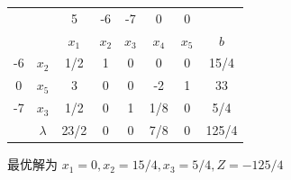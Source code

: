 \documentclass[../../main.tex]{subfiles}
\begin{document}
\begin{solution}
\begin{table}[H]
\begin{tabular}{c|c|cccccc}
               &             & 5       & -6      & -7      & 0       & 0       &       \\
               &             & \(x_1\) & \(x_2\) & \(x_3\) & \(x_4\) & \(x_5\) & \(b\) \\
            \hline
            -6 & \(x_2\)     & 1/2     & 1       & 0       & 0       & 0       & 15/4  \\
            0  & \(x_5\)     & 3       & 0       & 0       & -2      & 1       & 33    \\
            -7 & \(x_3\)     & 1/2     & 0       & 1       & 1/8     & 0       & 5/4   \\
               & \(\lambda\) & 23/2    & 0       & 0       & 7/8     & 0       & 125/4 \\
        \end{tabular}
    \end{table}
    最优解为  \(x_1 = 0, x_2 = 15/4, x_3 = 5/4, Z = -125/4\)
\end{solution}
\end{document}
